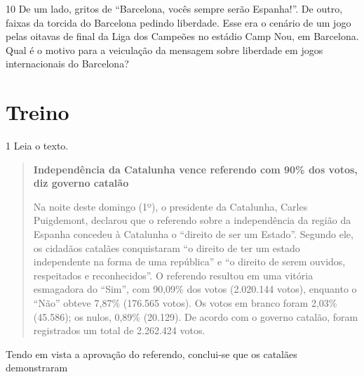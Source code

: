 \num{10} De um lado, gritos de ``Barcelona, vocês sempre serão
Espanha!''. De outro, faixas da torcida do Barcelona pedindo liberdade.
Esse era o cenário de um jogo pelas oitavas de final da Liga dos
Campeões no estádio Camp Nou, em Barcelona. Qual é o motivo para a
veiculação da mensagem sobre liberdade em jogos internacionais do
Barcelona?


\section{Treino}

\num{1} Leia o texto.

\begin{quote}
\textbf{Independência da Catalunha vence referendo com 90\% dos votos, diz governo catalão}

Na noite deste domingo (1º), o presidente da Catalunha, Carles
Puigdemont, declarou que o referendo sobre a independência da região da
Espanha concedeu à Catalunha o ``direito de ser um Estado''. Segundo
ele, os cidadãos catalães conquistaram ``o direito de ter um estado
independente na forma de uma república'' e ``o direito de serem ouvidos,
respeitados e reconhecidos''. O referendo resultou em uma vitória
esmagadora do ``Sim'', com 90,09\% dos votos (2.020.144 votos), enquanto
o ``Não'' obteve 7,87\% (176.565 votos). Os votos em branco foram 2,03\%
(45.586); os nulos, 0,89\% (20.129). De acordo com o governo catalão,
foram registrados um total de 2.262.424 votos.

\end{quote}

Tendo em vista a aprovação do referendo, conclui-se que os catalães
demonstraram

